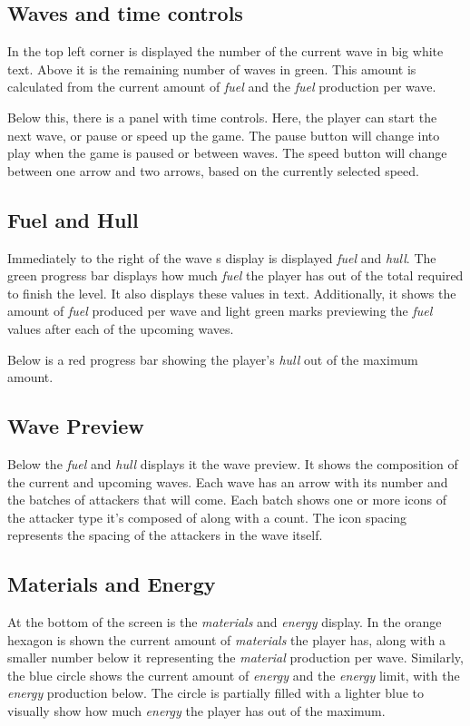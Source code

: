 \subsection{Waves and time controls}

In the top left corner is displayed the number of the current wave in big white text.
Above it is the remaining number of waves in green.
This amount is calculated from the current amount of \emph{fuel} and the \emph{fuel} production per wave.

Below this, there is a panel with time controls.
Here, the player can start the next wave, or pause or speed up the game.
The pause button will change into play when the game is paused or between waves.
The speed button will change between one arrow and two arrows, based on the currently selected speed.

\subsection{Fuel and Hull}

Immediately to the right of the wave s display is displayed \emph{fuel} and \emph{hull}.
The green progress bar displays how much \emph{fuel} the player has out of the total required to finish the level.
It also displays these values in text.
Additionally, it shows the amount of \emph{fuel} produced per wave and light green marks previewing the \emph{fuel} values after each of the upcoming waves.

Below is a red progress bar showing the player's \emph{hull} out of the maximum amount.

\subsection{Wave Preview}

Below the \emph{fuel} and \emph{hull} displays it the wave preview.
It shows the composition of the current and upcoming waves.
Each wave has an arrow with its number and the batches of attackers that will come.
Each batch shows one or more icons of the attacker type it's composed of along with a count.
The icon spacing represents the spacing of the attackers in the wave itself.

\subsection{Materials and Energy}

At the bottom of the screen is the \emph{materials} and \emph{energy} display.
In the orange hexagon is shown the current amount of \emph{materials} the player has, along with a smaller number below it representing the \emph{material} production per wave.
Similarly, the blue circle shows the current amount of \emph{energy} and the \emph{energy} limit, with the \emph{energy} production below.
The circle is partially filled with a lighter blue to visually show how much \emph{energy} the player has out of the maximum.


